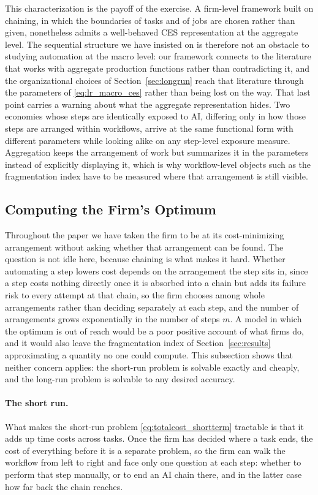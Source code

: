 This characterization is the payoff of the exercise.
A firm-level framework built on chaining, in which the boundaries of tasks and of jobs are chosen rather than given, nonetheless admits a well-behaved CES representation at the aggregate level.
The sequential structure we have insisted on is therefore not an obstacle to studying automation at the macro level: our framework connects to the literature that works with aggregate production functions rather than contradicting it, and the organizational choices of Section~\ref{sec:longrun} reach that literature through the parameters of \eqref{eq:lr_macro_ces} rather than being lost on the way.
That last point carries a warning about what the aggregate representation hides.
Two economies whose steps are identically exposed to AI, differing only in how those steps are arranged within workflows, arrive at the same functional form with different parameters while looking alike on any step-level exposure measure.
Aggregation keeps the arrangement of work but summarizes it in the parameters instead of explicitly displaying it, which is why workflow-level objects such as the fragmentation index have to be measured where that arrangement is still visible.


\subsection{Computing the Firm's Optimum}
\label{sec:extensions.computation}

Throughout the paper we have taken the firm to be at its cost-minimizing arrangement without asking whether that arrangement can be found.
The question is not idle here, because chaining is what makes it hard.
Whether automating a step lowers cost depends on the arrangement the step sits in, since a step costs nothing directly once it is absorbed into a chain but adds its failure risk to every attempt at that chain, so the firm chooses among whole arrangements rather than deciding separately at each step, and the number of arrangements grows exponentially in the number of steps $m$.
A model in which the optimum is out of reach would be a poor positive account of what firms do, and it would also leave the fragmentation index of Section~\ref{sec:results} approximating a quantity no one could compute.
This subsection shows that neither concern applies: the short-run problem is solvable exactly and cheaply, and the long-run problem is solvable to any desired accuracy.

\paragraph{The short run.}
What makes the short-run problem \eqref{eq:totalcost_shortterm} tractable is that it adds up time costs across tasks.
Once the firm has decided where a task ends, the cost of everything before it is a separate problem, so the firm can walk the workflow from left to right and face only one question at each step: whether to perform that step manually, or to end an AI chain there, and in the latter case how far back the chain reaches.

